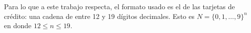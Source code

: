 
Para lo que a este trabajo respecta, el formato usado es el de las tarjetas de crédito: una cadena de entre 12 y 19 dígitos decimales. Esto es $ N = \{0, 1, \dots, 9\}^n $ en donde $ 12 \leq n \leq 19 $.
